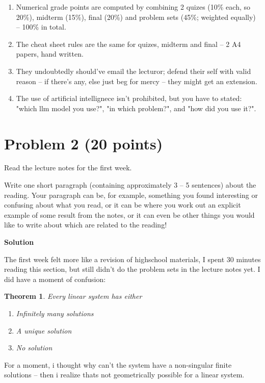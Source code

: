 \documentclass{article}
\newcommand{\solution}{\textbf{\large Solution}}
\newtheorem*{theorem}{Theorem}
\theoremstyle{remark}
\begin{document}
\begin{enumerate}
    \item[(i)] Numerical grade points are computed by combining 2 quizes (10\% each, so 20\%), midterm (15\%), final (20\%) and problem sets (45\%; weighted equally) -- 100\% in total. 
    \item[(ii)] The cheat sheet rules are the same for quizes, midterm and final -- 2 A4 papers, hand written.
    \item[(iii)] They undoubtedly should've email the lecturor; defend their self with valid reason -- if there's any, else just beg for mercy -- they might get an extension.
    \item[(iv)] The use of artificial intellignece isn't prohibited, but you have to stated: "which llm model you use?", "in which problem?", and "how did you use it?".
\end{enumerate}

\newpage

\section*{Problem 2 (20 points)}

Read the lecture notes for the first week.

Write one short paragraph (containing approximately 3 -- 5 sentences) about the reading. Your
paragraph can be, for example, something you found interesting or confusing about what you read,
or it can be where you work out an explicit example of some result from the notes, or it can even
be other things you would like to write about which are related to the reading!

\medskip
\solution

The first week felt more like a revision of highschool materials, I spent 30 minutes reading this section, but still didn't do the problem sets in the lecture notes yet.
I did have a moment of confusion:

\begin{theorem}
Every linear system has either
\begin{enumerate}
    \item[(i)] Infinitely many solutions
    \item[(ii)] A unique solution
    \item[(iii)] No solution
\end{enumerate}
\end{theorem}

For a moment, i thought why can't the system have a non-singular finite solutions -- then i realize thats not geometrically possible for a linear system. 
\end{document}
